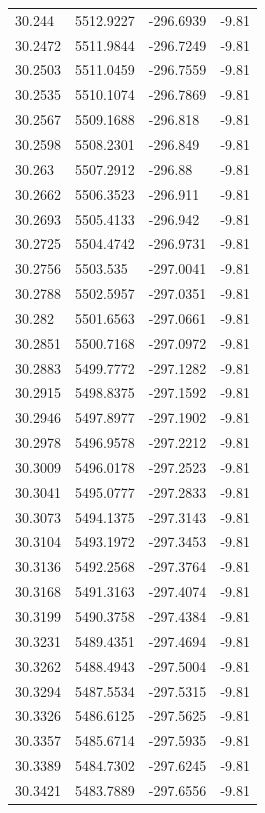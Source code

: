 \begin{table}[H]
\begin{tabular}{llll}
30.244 & 5512.9227 & -296.6939 & -9.81 \\
30.2472 & 5511.9844 & -296.7249 & -9.81 \\
30.2503 & 5511.0459 & -296.7559 & -9.81 \\
30.2535 & 5510.1074 & -296.7869 & -9.81 \\
30.2567 & 5509.1688 & -296.818 & -9.81 \\
30.2598 & 5508.2301 & -296.849 & -9.81 \\
30.263 & 5507.2912 & -296.88 & -9.81 \\
30.2662 & 5506.3523 & -296.911 & -9.81 \\
30.2693 & 5505.4133 & -296.942 & -9.81 \\
30.2725 & 5504.4742 & -296.9731 & -9.81 \\
30.2756 & 5503.535 & -297.0041 & -9.81 \\
30.2788 & 5502.5957 & -297.0351 & -9.81 \\
30.282 & 5501.6563 & -297.0661 & -9.81 \\
30.2851 & 5500.7168 & -297.0972 & -9.81 \\
30.2883 & 5499.7772 & -297.1282 & -9.81 \\
30.2915 & 5498.8375 & -297.1592 & -9.81 \\
30.2946 & 5497.8977 & -297.1902 & -9.81 \\
30.2978 & 5496.9578 & -297.2212 & -9.81 \\
30.3009 & 5496.0178 & -297.2523 & -9.81 \\
30.3041 & 5495.0777 & -297.2833 & -9.81 \\
30.3073 & 5494.1375 & -297.3143 & -9.81 \\
30.3104 & 5493.1972 & -297.3453 & -9.81 \\
30.3136 & 5492.2568 & -297.3764 & -9.81 \\
30.3168 & 5491.3163 & -297.4074 & -9.81 \\
30.3199 & 5490.3758 & -297.4384 & -9.81 \\
30.3231 & 5489.4351 & -297.4694 & -9.81 \\
30.3262 & 5488.4943 & -297.5004 & -9.81 \\
30.3294 & 5487.5534 & -297.5315 & -9.81 \\
30.3326 & 5486.6125 & -297.5625 & -9.81 \\
30.3357 & 5485.6714 & -297.5935 & -9.81 \\
30.3389 & 5484.7302 & -297.6245 & -9.81 \\
30.3421 & 5483.7889 & -297.6556 & -9.81 \\

\end{tabular}
\end{table}
